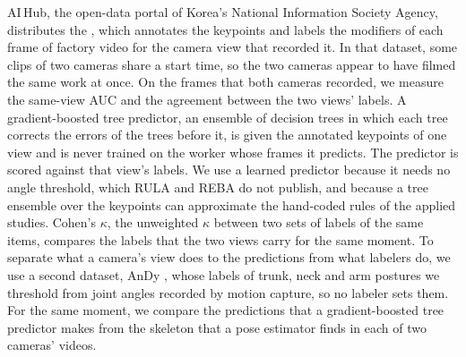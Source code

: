 \documentclass[review,3p,authoryear]{elsarticle}
\begin{document}
AI\,Hub, the open-data portal of Korea's National Information Society Agency, distributes
the \datasetName, which annotates the keypoints and labels the modifiers of each frame of
factory video for the camera view that recorded it. In that dataset, some clips of two
cameras share a start time, so the two cameras appear to have filmed the same work at
once. On the frames that both cameras recorded, we measure the same-view AUC and the
agreement between the two views' labels. A gradient-boosted tree predictor, an ensemble of
decision trees in which each tree corrects the errors of the trees before it, is given the
annotated keypoints of one view and is never trained on the worker whose frames it
predicts. The predictor is scored against that view's labels. We use a learned predictor because it needs no angle threshold, which RULA and REBA do
not publish, and because a tree ensemble over the keypoints can approximate the hand-coded
rules of the applied studies. Cohen's $\kappa$, the unweighted $\kappa$ between two sets of labels of the same items, compares the labels that the two views carry for the same moment. To
separate what a camera's view does to the predictions from what labelers do, we use a
second dataset, AnDy \citep{maurice2019andy}, whose labels of trunk, neck and arm postures
we threshold from joint angles recorded by motion capture, so no labeler sets them. For the same moment, we compare the
predictions that a gradient-boosted tree predictor makes from the skeleton that a pose
estimator finds in each of two cameras' videos.
\end{document}
